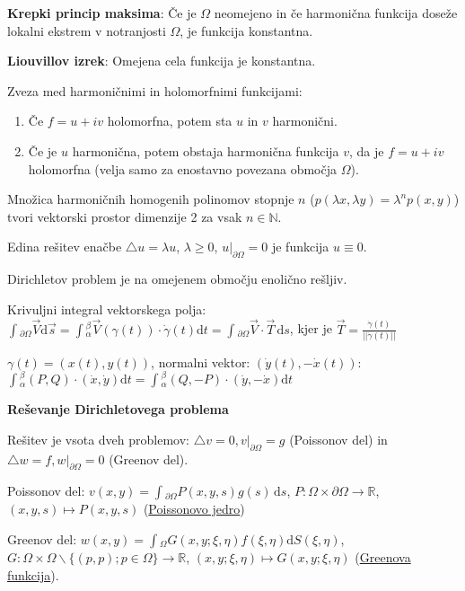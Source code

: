 \documentclass[11pt,a4paper]{amsart}
\theoremstyle{definition} %
\theoremstyle{plain} %
\newcommand{\ds}{\ensuremath{\,\mathrm{d}s}}
\let\oldint\int
\renewcommand{\int}{\oldint \!}
\newcommand{\R}{\mathbb R}
\newcommand{\N}{\mathbb N}
\begin{document}
\textbf{Krepki princip maksima}: Če je $\Omega$ neomejeno in če harmonična funkcija doseže lokalni ekstrem v notranjosti $\Omega$, je funkcija konstantna.

\textbf{Liouvillov izrek}: Omejena cela funkcija je konstantna.

Zveza med harmoničnimi in holomorfnimi funkcijami:
\begin{enumerate}
\item Če $f = u + iv$ holomorfna, potem sta $u$ in $v$ harmonični.
\item Če je $u$ harmonična, potem obstaja harmonična funkcija $v$, da je $f = u + iv$ holomorfna (velja samo za enostavno povezana območja $\Omega$).
\end{enumerate}

Množica harmoničnih homogenih polinomov stopnje $n$ ($p(\lambda x,\lambda y) = \lambda^n p(x,y)$) tvori vektorski prostor dimenzije 2 za vsak $n \in \N$.

Edina rešitev enačbe $\triangle u = \lambda u$, $\lambda \geq 0$, $u|_{\partial \Omega} = 0$ je funkcija $u \equiv 0$.

Dirichletov problem je na omejenem območju enolično rešljiv.

Krivuljni integral vektorskega polja: $\int_{\partial \Omega}\vec{V} \mathrm{d}\vec{s} = \int_\alpha^\beta \vec{V}(\gamma (t))\cdot \dot{\gamma} (t)  \mathrm{d}t = \int_{\partial \Omega} \vec{V} \cdot \vec{T} \ds$, kjer je $\vec{T} = \frac{\dot{\gamma}(t)}{||\dot{\gamma}(t)||}$

$\gamma (t) = (x(t),y(t))$, normalni vektor: $(\dot{y}(t), -\dot{x}(t))$: $\int_\alpha^\beta (P,Q)\cdot (\dot{x},\dot{y}) \mathrm{d}t = \int_\alpha^\beta (Q,-P)\cdot (\dot{y},-\dot{x}) \mathrm{d}t $

\textbf{Reševanje Dirichletovega problema}

Rešitev je vsota dveh problemov: $\triangle v = 0, v|_{\partial \Omega} = g$ (Poissonov del) in $\triangle w = f, w|_{\partial \Omega} = 0$ (Greenov del).

Poissonov del: $v(x,y) = \int_{\partial \Omega} P(x,y,s)g(s)\ds$, $P:\Omega \times \partial \Omega \rightarrow \R$, $(x,y,s) \mapsto P(x,y,s)$ (\underline{Poissonovo jedro})

Greenov del: $w(x,y) = \int_\Omega G(x,y;\xi,\eta ) f(\xi , \eta )  \mathrm{d}S(\xi,\eta)$, $G: \Omega \times \Omega \backslash \{ (p,p); p\in \Omega \}  \rightarrow \R$, $(x,y;\xi,\eta) \mapsto G(x,y; \xi, \eta)$ (\underline{Greenova funkcija}).
\end{document}
